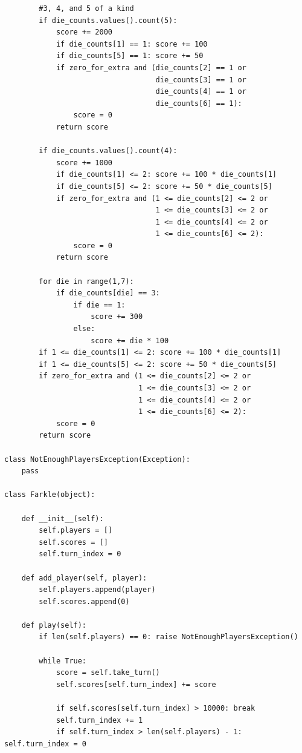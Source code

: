 \documentclass{article}
\begin{document}
\begin{lstlisting}
        #3, 4, and 5 of a kind
        if die_counts.values().count(5):
            score += 2000
            if die_counts[1] == 1: score += 100
            if die_counts[5] == 1: score += 50
            if zero_for_extra and (die_counts[2] == 1 or
                                   die_counts[3] == 1 or
                                   die_counts[4] == 1 or
                                   die_counts[6] == 1):
                score = 0
            return score

        if die_counts.values().count(4):
            score += 1000
            if die_counts[1] <= 2: score += 100 * die_counts[1]
            if die_counts[5] <= 2: score += 50 * die_counts[5]
            if zero_for_extra and (1 <= die_counts[2] <= 2 or
                                   1 <= die_counts[3] <= 2 or
                                   1 <= die_counts[4] <= 2 or
                                   1 <= die_counts[6] <= 2):
                score = 0
            return score

        for die in range(1,7):
            if die_counts[die] == 3:
                if die == 1:
                    score += 300
                else:
                    score += die * 100
        if 1 <= die_counts[1] <= 2: score += 100 * die_counts[1]
        if 1 <= die_counts[5] <= 2: score += 50 * die_counts[5]
        if zero_for_extra and (1 <= die_counts[2] <= 2 or
                               1 <= die_counts[3] <= 2 or
                               1 <= die_counts[4] <= 2 or
                               1 <= die_counts[6] <= 2):
            score = 0
        return score

class NotEnoughPlayersException(Exception):
    pass

class Farkle(object):

    def __init__(self):
        self.players = []
        self.scores = []
        self.turn_index = 0

    def add_player(self, player):
        self.players.append(player)
        self.scores.append(0)

    def play(self):
        if len(self.players) == 0: raise NotEnoughPlayersException()

        while True:
            score = self.take_turn()
            self.scores[self.turn_index] += score

            if self.scores[self.turn_index] > 10000: break
            self.turn_index += 1
            if self.turn_index > len(self.players) - 1: self.turn_index = 0


\end{lstlisting}
\end{document}
